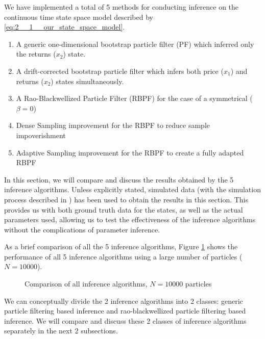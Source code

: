 \documentclass[../main.tex]{subfiles}
\begin{document}
	
We have implemented a total of 5 methods for conducting inference on the continuous time state space model described by \autoref{eq:2__1__our_state_space_model}. 

\begin{enumerate}
	\item A generic one-dimensional bootstrap particle filter (PF) which inferred only the returns ($x_2$) state.
	\item A drift-corrected bootstrap particle filter which infers both price ($x_1$) and returns ($x_2$) states simultaneously. 
	\item A Rao-Blackwellized Particle Filter (RBPF) for the case of a symmetrical \asd ($\beta = 0$)
	\item Dense Sampling improvement for the RBPF to reduce sample impoverishment 
	\item Adaptive Sampling improvement for the RBPF to create a fully adapted RBPF 
\end{enumerate} 

In this section, we will compare and discuss the results obtained by the 5 inference algorithms. Unless explicitly stated, simulated data (with the simulation process described in ) has been used to obtain the results in this section. This provides us with both ground truth data for the states, as well as the actual parameters used, allowing us to test the effectiveness of the inference algorithms without the complications of parameter inference.

As a brief comparison of all the 5 inference algorithms, Figure \ref{fig:4__1__comparison} shows the performance of all 5 inference algorithms using a large number of particles ($N=10000$).

\begin{figure}[h!]
	\centering
	\qquad
	\caption{Comparison of all inference algorithms, $N = 10000$ particles}
	\label{fig:4__1__comparison}
\end{figure}
	
We can conceptually divide the 2 inference algorithms into 2 classes: generic particle filtering based inference and rao-blackwellized particle filtering based inference. We will compare and discuss these 2 classes of inference algorithms separately in the next 2 subsections.
	
\end{document}
